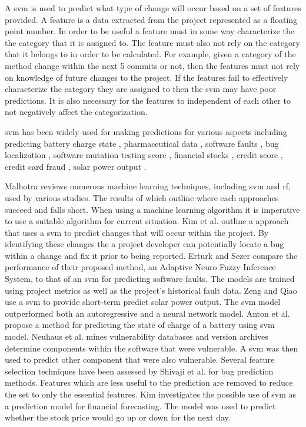 
A \gls{svm} is used to predict what type of change will occur based on a set of features provided. A feature is a data extracted from the project represented as a floating point number. In order to be useful a feature must in some way characterize the the category that it is assigned to. The feature must also not rely on the category that it belongs to in order to be calculated. For example, given a category of the method change within the next 5 commits or not, then the features must not rely on knowledge of future changes to the project. If the features fail to effectively characterize the category they are assigned to then the \gls{svm} may have poor predictions. It is also necessary for the features to independent of each other to not negatively affect the categorization.


\gls{svm} has been widely used for making predictions for various aspects including predicting battery charge state \cite{Anton2013}, pharmaceutical data \cite{Burbidge2001}, software faults \cite{Gondra2008, Erturk2015, Malhotra2015, Kim2008, Moeyersoms2015, Neuhaus2007}, bug localization \cite{Murphy2007, Neuhaus2007}, software mutation testing score \cite{Jalbert2012}, financial stocks \cite{Kim2003}, credit score \cite{Huang2007}, credit card fraud \cite{Westland2011}, solar power output \cite{Zeng2016}.

Malhotra reviews numerous machine learning techniques, including \gls{svm} and \gls{rf}, used by various studies. The results of which outline where each approaches succeed and falls short. When using a machine learning algorithm it is imperative to use a suitable algorithm for current situation. Kim et al. outline a approach that uses a \gls{svm} to predict changes that will occur within the project. By identifying these changes the a project developer can potentially locate a bug within a change and fix it prior to being reported. Erturk and Sezer compare the performance of their proposed method, an Adaptive Neuro Fuzzy Inference System, to that of an \gls{svm} for predicting software faults. The models are trained using project metrics as well as the project's historical fault data. Zeng and Qiao use a \gls{svm} to provide short-term predict solar power output. The \gls{svm} model outperformed both an autoregressive and a neural network model. Anton et al. propose a method for predicting the state of charge of a battery using \gls{svm} model. Neuhaus et al. mines vulnerability databases and version archives determine components within the software that were vulnerable. A \gls{svm} was then used to predict other component that were also vulnerable. Several feature selection techniques have been assessed by Shivaji et al. for bug prediction methods. Features which are less useful to the prediction are removed to reduce the set to only the essential features. Kim investigates the possible use of \gls{svm} as a prediction model for financial forecasting. The model was used to predict whether the stock price would go up or down for the next day.

